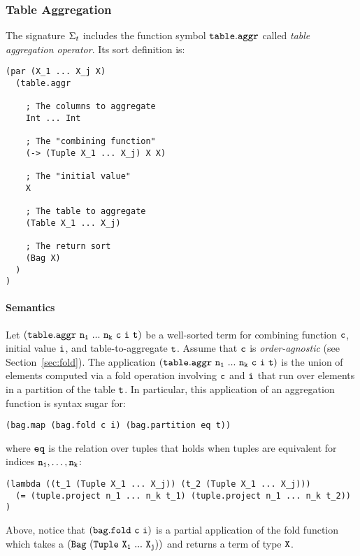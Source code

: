 \documentclass[english,a4paper,10pt]{article}
\begin{document}
\subsubsection{Table Aggregation}
The signature $\Sigma_{t}$ includes 
the function symbol ${\tt table.aggr}$
called \emph{table aggregation operator}. Its sort definition is:

\begin{verbatim}
(par (X_1 ... X_j X) 
  (table.aggr
  
    ; The columns to aggregate
    Int ... Int
    
    ; The "combining function"
    (-> (Tuple X_1 ... X_j) X X)
    
    ; The "initial value"
    X
    
    ; The table to aggregate
    (Table X_1 ... X_j)
    
    ; The return sort
    (Bag X)
  )
)
\end{verbatim}

\paragraph{Semantics}
Let $\syntax{(table.aggr\ n_1\ ...\ n_k\ c\ i\ t)}$
be a well-sorted term for
combining function ${\tt c}$, 
initial value ${\tt i}$,
and table-to-aggregate ${\tt t}$.
Assume that ${\tt c}$ is \emph{order-agnostic} (see Section~\ref{sec:fold}).
The application $\syntax{(table.aggr\ n_1\ ...\ n_k\ c\ i\ t)}$ is
the union of elements computed via a fold operation involving ${\tt c}$ and ${\tt i}$
that run over elements in a partition of the table ${\tt t}$.
In particular, this application of an aggregation function is syntax sugar for:
\begin{verbatim}
(bag.map (bag.fold c i) (bag.partition eq t))
\end{verbatim}
where ${\tt eq}$ is the relation over tuples that holds
when tuples are equivalent for indices ${\tt n_1}, \ldots, {\tt n_k}$:
\begin{verbatim}
(lambda ((t_1 (Tuple X_1 ... X_j)) (t_2 (Tuple X_1 ... X_j)))
  (= (tuple.project n_1 ... n_k t_1) (tuple.project n_1 ... n_k t_2))
)
\end{verbatim}
Above, notice that 
$\syntax{(bag.fold\ c\ i)}$ is a partial application of the fold
function which takes a $\syntax{(Bag\ (Tuple\ X_1\ ...\ X_j))}$
and returns a term of type ${\tt X}$.
\end{document}
